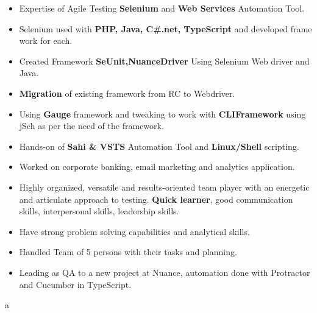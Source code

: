 

\begin{cvparagraph}

\begin{itemize}
 \item {Expertise of Agile Testing \textbf{Selenium} and \textbf{Web Services} Automation Tool.}

 \item {Selenium used with \textbf{PHP, Java, C\#.net, TypeScript} and developed frame work for each.}

 \item {Created Framework \textbf{SeUnit,NuanceDriver} Using Selenium Web driver and Java.}

 \item {\textbf{Migration} of existing framework from RC to Webdriver.}

 \item {Using \textbf{Gauge} framework and tweaking to work with \textbf{CLIFramework} using jSch as per the need of the framework.}

 \item {Hands-on of \textbf{Sahi \& VSTS} Automation Tool and \textbf{Linux/Shell} scripting.}

 \item {Worked on corporate banking, email marketing and analytics application.}

 \item {Highly organized, versatile and results-oriented team player with an energetic and articulate approach to testing. \textbf{Quick learner}, good communication skills, interpersonal skills, leadership skills.}

 \item {Have strong problem solving capabilities and analytical skills.}

 \item {Handled Team of 5 persons with their tasks and planning.}
 
 \item {Leading as QA to a new project at Nuance, automation done with Protractor and Cucumber in TypeScript.}
\end{itemize}
\end{cvparagraph}
a